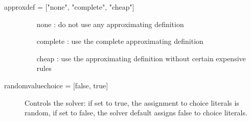 \begin{description}
	\item[{approxdef = ["none", "complete", "cheap"]}]
		\begin{itemize}
		\item [none]: do not use any approximating definition
		\item [complete]: use the complete approximating definition
		\item [cheap]: use the approximating definition without certain expensive rules
		\end{itemize}
	\item[{randomvaluechoice = [false, true]}] Controls the solver: if set to true, the assignment to choice literals is random, if set to false, the solver default assigns false to choice literals.
\end{description}
